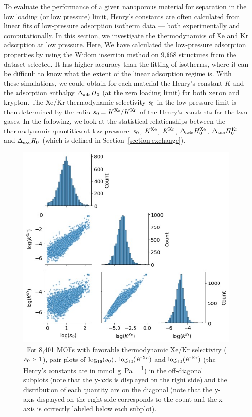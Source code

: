 \documentclass[main.tex]{subfiles}
\begin{document}
To evaluate the performance of a given nanoporous material for separation in the low loading (or low pressure) limit, Henry's constants are often calculated from linear fits of low-pressure adsorption isotherm data --- both experimentally and computationally. In this section, we investigate the thermodynamics of Xe and Kr adsorption at low pressure. Here, We have calculated the low-pressure adsorption properties by using the Widom insertion method\cite{Widom1963, frenkel2001widom} on 9,668 structures from the dataset selected. It has higher accuracy than the fitting of isotherms, where it can be difficult to know what the extent of the linear adsorption regime is. With these simulations, we could obtain for each material the Henry's constant $K$ and the adsorption enthalpy $\Delta_{\text{ads}}H_{\text{0}}$ (at the zero loading limit) for both xenon and krypton. The Xe/Kr thermodynamic selectivity $s_{\text{0}}$ in the low-pressure limit is then determined by the ratio $s_{\text{0}} = K^{\text{Xe}}/K^{\text{Kr}}$ of the Henry's constants for the two gases. In the following, we look at the statistical relationships between the thermodynamic quantities at low pressure: $s_{\text{0}}$, $K^{\text{Xe}}$, $K^{\text{Kr}}$, $\Delta_{\text{ads}}H_{\text{0}}^{\text{Xe}}$, $\Delta_{\text{ads}}H_{\text{0}}^{\text{Kr}}$ and $\Delta_{\text{exc}}H_{\text{0}}$ (which is defined in Section~\ref{section:exchange}).


\begin{figure}[t]
\centering
  \includegraphics[width=\linewidth]{figures/2-thermo/Henry_0.jpg}
  \caption{\ For 8,401 MOFs with favorable thermodynamic Xe/Kr selectivity ($s_{\text{0}} > 1$), pair-plots of $\log_{\text{10}}(s_{\text{0}})$, $\log_{\text{10}}(K^{\text{Xe}})$ and $\log_{\text{10}}(K^{\text{Kr}})$ (the Henry's constants are in \si{\milli\mol\per\gram\per\pascal}) in the off-diagonal subplots (note that the y-axis is displayed on the right side) and the distribution of each quantity are on the diagonal (note that the y-axis displayed on the right side corresponds to the count and the x-axis is correctly labeled below each subplot).}
  \label{fgr:histo_K}
\end{figure}
\end{document}
